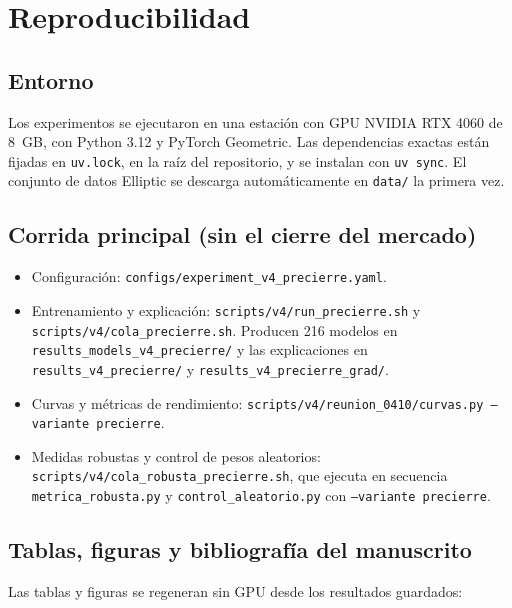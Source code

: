 \chapter{Reproducibilidad}\label{anx:reproducibilidad}
\sloppy

\section{Entorno}

Los experimentos se ejecutaron en una estación con GPU NVIDIA RTX 4060 de 8~GB, con Python
3.12 y PyTorch Geometric. Las dependencias exactas están fijadas en \texttt{uv.lock}, en la raíz
del repositorio, y se instalan con \texttt{uv sync}. El conjunto de datos Elliptic se descarga
automáticamente en \texttt{data/} la primera vez.

\section{Corrida principal (sin el cierre del mercado)}

\begin{itemize}
  \item Configuración: \texttt{configs/experiment\_v4\_precierre.yaml}.
  \item Entrenamiento y explicación: \texttt{scripts/v4/run\_precierre.sh} y
        \texttt{scripts/v4/cola\_precierre.sh}. Producen 216 modelos en
        \texttt{results\_models\_v4\_precierre/} y las explicaciones en
        \texttt{results\_v4\_precierre/} y \texttt{results\_v4\_precierre\_grad/}.
  \item Curvas y métricas de rendimiento:
        \texttt{scripts/v4/reunion\_0410/curvas.py --variante precierre}.
  \item Medidas robustas y control de pesos aleatorios:
        \texttt{scripts/v4/cola\_robusta\_precierre.sh}, que ejecuta en secuencia
        \texttt{metrica\_robusta.py} y \texttt{control\_aleatorio.py} con
        \texttt{--variante precierre}.
\end{itemize}

\section{Tablas, figuras y bibliografía del manuscrito}

Las tablas y figuras se regeneran sin GPU desde los resultados guardados:

